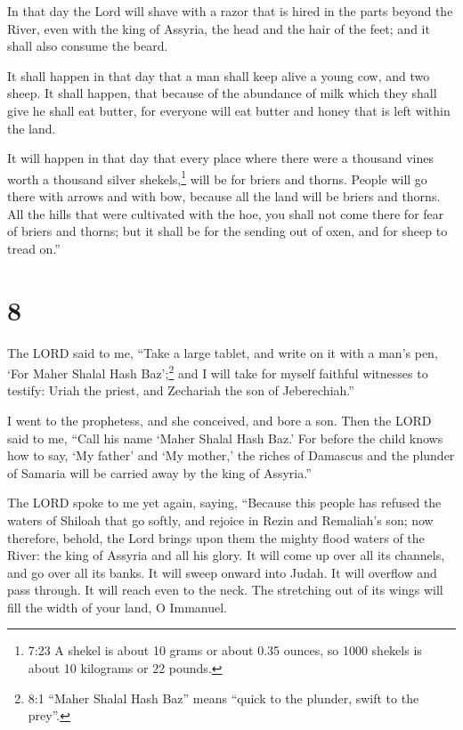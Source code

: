  In that day the Lord will shave with a razor that is hired
in the parts beyond the River, even with the king of Assyria, the head
and the hair of the feet; and it shall also consume the beard.

 It shall happen in that day that a man shall keep alive a
young cow, and two sheep.  It shall happen, that because of
the abundance of milk which they shall give he shall eat butter, for
everyone will eat butter and honey that is left within the land.

 It will happen in that day that every place where there
were a thousand vines worth a thousand silver shekels,\footnote{7:23 A
  shekel is about 10 grams or about 0.35 ounces, so 1000 shekels is
  about 10 kilograms or 22 pounds.} will be for briers and thorns.
 People will go there with arrows and with bow, because all
the land will be briers and thorns.  All the hills that
were cultivated with the hoe, you shall not come there for fear of
briers and thorns; but it shall be for the sending out of oxen, and for
sheep to tread on.''

\hypertarget{section-7}{%
\section{8}\label{section-7}}

 The LORD said to me, ``Take a large tablet, and write on it
with a man's pen, `For Maher Shalal Hash Baz';\footnote{8:1 ``Maher
  Shalal Hash Baz'' means ``quick to the plunder, swift to the prey''.}
 and I will take for myself faithful witnesses to testify:
Uriah the priest, and Zechariah the son of Jeberechiah.''

 I went to the prophetess, and she conceived, and bore a
son. Then the LORD said to me, ``Call his name `Maher Shalal Hash Baz.'
 For before the child knows how to say, `My father' and `My
mother,' the riches of Damascus and the plunder of Samaria will be
carried away by the king of Assyria.''

 The LORD spoke to me yet again, saying, 
``Because this people has refused the waters of Shiloah that go softly,
and rejoice in Rezin and Remaliah's son;  now therefore,
behold, the Lord brings upon them the mighty flood waters of the River:
the king of Assyria and all his glory. It will come up over all its
channels, and go over all its banks.  It will sweep onward
into Judah. It will overflow and pass through. It will reach even to the
neck. The stretching out of its wings will fill the width of your land,
O Immanuel.


